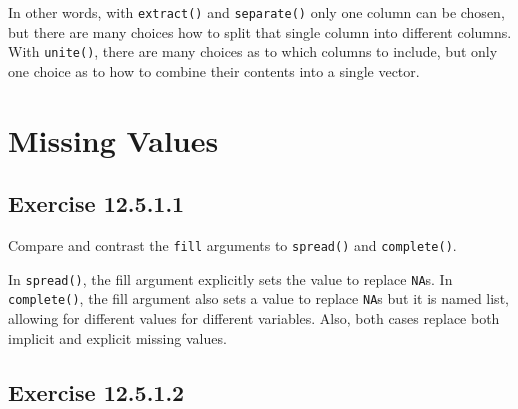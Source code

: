 \documentclass[]{book}
\newenvironment{Shaded}{\begin{snugshade}}{\end{snugshade}}
\newcommand{\CommentTok}[1]{\textcolor[rgb]{0.56,0.35,0.01}{\textit{#1}}}
\newcommand{\DataTypeTok}[1]{\textcolor[rgb]{0.13,0.29,0.53}{#1}}
\newcommand{\DecValTok}[1]{\textcolor[rgb]{0.00,0.00,0.81}{#1}}
\newcommand{\KeywordTok}[1]{\textcolor[rgb]{0.13,0.29,0.53}{\textbf{#1}}}
\newcommand{\NormalTok}[1]{#1}
\newcommand{\OperatorTok}[1]{\textcolor[rgb]{0.81,0.36,0.00}{\textbf{#1}}}
\newcommand{\StringTok}[1]{\textcolor[rgb]{0.31,0.60,0.02}{#1}}
\theoremstyle{plain}
\theoremstyle{remark}
\begin{document}
\begin{Shaded}
\end{Shaded}

In other words, with \texttt{extract()} and \texttt{separate()} only one
column can be chosen, but there are many choices how to split that
single column into different columns. With \texttt{unite()}, there are
many choices as to which columns to include, but only one choice as to
how to combine their contents into a single vector.

\hypertarget{missing-values-1}{%
\section{Missing Values}\label{missing-values-1}}

\hypertarget{exercise-12.5.1.1}{%
\subsection*{\texorpdfstring{Exercise
{12.5.1.1}}{Exercise 12.5.1.1}}\label{exercise-12.5.1.1}}

Compare and contrast the \texttt{fill} arguments to \texttt{spread()}
and \texttt{complete()}.

In \texttt{spread()}, the fill argument explicitly sets the value to
replace \texttt{NA}s. In \texttt{complete()}, the fill argument also
sets a value to replace \texttt{NA}s but it is named list, allowing for
different values for different variables. Also, both cases replace both
implicit and explicit missing values.

\hypertarget{exercise-12.5.1.2}{%
\subsection*{\texorpdfstring{Exercise
{12.5.1.2}}{Exercise 12.5.1.2}}\label{exercise-12.5.1.2}}
\end{document}
